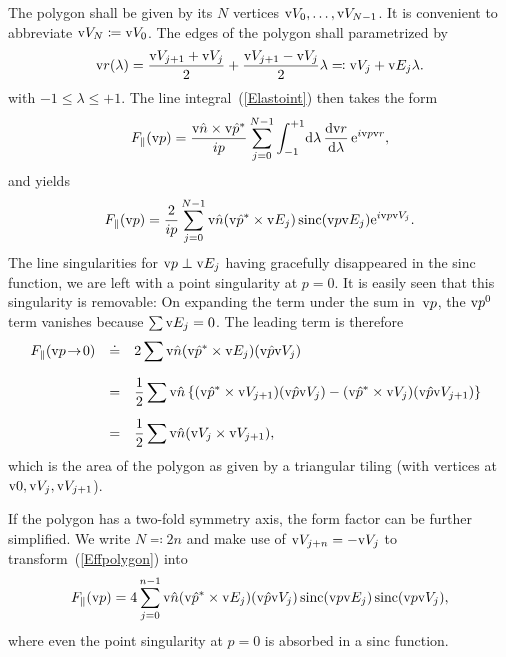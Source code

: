 The polygon shall be given by its $N$ vertices $\text{v}{V}_0,\ldots,\text{v}{V}_{N-1}$.
It is convenient to abbreviate $\text{v}{V}_N\coloneqq\text{v}{V}_0$.
The edges of the polygon shall parametrized by
\begin{equation}
  \text{v}{r}(\lambda) = \frac{\text{v}{V}_{j+1}+\text{v}{V}_j}{2} + \frac{\text{v}{V}_{j+1}-\text{v}{V}_j}{2} \lambda
  \eqqcolon \text{v}{V}_j + \text{v}{E}_j\lambda.
\end{equation}
with $-1\le\lambda\le+1$.
The line integral~(\ref{Elastoint}) then takes the form
\begin{equation}
    F_\parallel(\text{v}{p})
   = \frac{\text{v}{\hat n}\times\text{v}{\hat p}^*}{ip} \sum_{j=0}^{N-1}
              \int_{-1}^{+1}\!\text{d}\lambda\, \frac{\text{d}\text{v}{r}}{\text{d}\lambda}\,\text{e}^{i\text{v}{p}\text{v}{r}},
\end{equation}
and yields
\begin{equation}\label{Effpolygon}
    F_\parallel(\text{v}{p})
    = \frac{2}{ip} \sum_{j=0}^{N-1} \text{v}{\hat n}(\text{v}{\hat p}^*\times\text{v}{E}_j) \operatorname{sinc}(\text{v}{p}\text{v}{E}_j) \text{e}^{i\text{v}{p}\text{v}{V}_j}.
\end{equation}
The line singularities for $\text{v}{p}\perp\text{v}{E}_j$ having gracefully disappeared in the
sinc function,
we are left with a point singularity at $p=0$.
It is easily seen that this singularity is removable:
On expanding the term under the sum in~$\text{v}{p}$,
the $\text{v}{p}^0$ term vanishes because $\sum\text{v}{E}_j=0$.
The leading term is therefore
\begin{equation}
  \begin{array}{@{}lcl}
  F_\parallel(\qp\!\to\!0)
    &\doteq& \displaystyle 2\sum \n(\uqp^*\times\E_j) (\uqp\V_j)\\[3ex]
    &=&\displaystyle \frac{1}{2}\sum \n\left\{
        (\uqp^*\times\V_{j+1})(\uqp\V_j)
      - (\uqp^*\times\V_j)(\uqp\V_{j+1})
      \right\}\\[3ex]
    &=&\displaystyle \frac{1}{2}\sum \n(\V_j\times\V_{j+1}),
  \end{array}
\end{equation}
which is the area of the polygon
as given by a triangular tiling (with vertices at $\text{v}{0},\text{v}{V}_j,\text{v}{V}_{j+1}$).

If the polygon has a two-fold symmetry axis,
the form factor can be further simplified.
We write $N\eqqcolon2n$
and make use of $\text{v}{V}_{j+n}=-\text{v}{V}_j$ to transform~(\ref{Effpolygon}) into
\begin{equation}\label{Eff2ngon}
    F_\parallel(\text{v}{p}) = \displaystyle 4 \sum_{j=0}^{n-1}
              \text{v}{\hat n}(\text{v}{\hat p}^*\times\text{v}{E}_j) (\text{v}{\hat p}\text{v}{V}_j) \operatorname{sinc}(\text{v}{p}\text{v}{E}_j) \operatorname{sinc}(\text{v}{p}\text{v}{V}_j),
\end{equation}
where even the point singularity at $p=0$ is absorbed in a sinc function.
%
%


